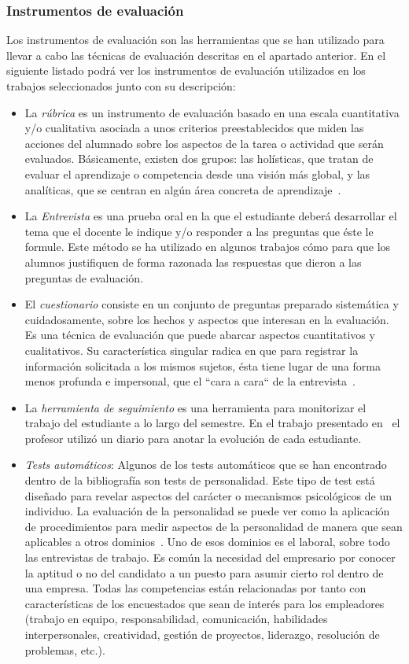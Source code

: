 \subsubsection{Instrumentos de evaluación}

Los instrumentos de evaluación son las herramientas que se han utilizado para llevar a cabo las técnicas de evaluación descritas en el apartado anterior. En el siguiente listado podrá ver los instrumentos de evaluación utilizados en los trabajos seleccionados junto con su descripción:

\begin{itemize}
\item La \emph{rúbrica} es un instrumento de evaluación basado en una escala cuantitativa y/o cualitativa asociada a unos criterios preestablecidos que miden las acciones del alumnado sobre los aspectos de la tarea o actividad que serán evaluados.  Básicamente, existen dos grupos: las holísticas, que tratan de evaluar el aprendizaje o competencia desde una visión más global, y las analíticas, que se centran en algún área concreta de aprendizaje~\cite{torres2010rubrica}.
\item La \emph{Entrevista} es una prueba oral en la que el estudiante deberá desarrollar el tema que el docente le indique y/o responder a las preguntas que éste le formule. Este método se ha utilizado en algunos trabajos cómo \cite{ward2011developing} para que los alumnos justifiquen de forma razonada las respuestas que dieron a las preguntas de evaluación.
\item El \emph{cuestionario} consiste en un conjunto de preguntas preparado sistemática y cuidadosamente, sobre los hechos y aspectos que interesan en la evaluación.  Es una técnica de evaluación que puede abarcar aspectos cuantitativos y cualitativos. Su característica singular radica en que para registrar la información solicitada a los mismos sujetos, ésta tiene lugar de una forma menos profunda e impersonal, que el ``cara a cara`` de la entrevista~\cite{munoz2003cuestionario}. 
\item La \emph{herramienta de seguimiento} es una herramienta para monitorizar el trabajo del estudiante a lo largo del semestre. En el trabajo presentado en~\cite{lacuesta2009active} el profesor utilizó un diario para anotar la evolución de cada estudiante.
\item \emph{Tests automáticos}: Algunos de los tests automáticos que se han encontrado dentro de la bibliografía son tests de personalidad. Este tipo de test está diseñado para revelar aspectos del carácter o mecanismos psicológicos de un individuo. La evaluación de la personalidad se puede ver como la aplicación de procedimientos para medir aspectos de la personalidad de manera que sean aplicables a otros dominios~\cite{wiggins2003paradigms}. Uno de esos dominios es el laboral, sobre todo las entrevistas de trabajo. Es común la necesidad del empresario por conocer la aptitud o no del candidato a un puesto para asumir cierto rol dentro de una empresa. Todas las competencias están relacionadas por tanto con características de los encuestados que sean de interés para los empleadores (trabajo en equipo, responsabilidad, comunicación, habilidades interpersonales, creatividad, gestión de proyectos, liderazgo, resolución de problemas, etc.).

\end{itemize}
